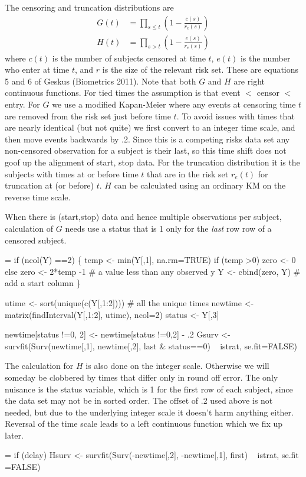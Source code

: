\documentclass{article}
\begin{document}
The censoring and truncation distributions are
\begin{align*}
  G(t) &= \prod_{s \le t} \left(1 - \frac{c(s)}{r_c(s)} \right ) \\
  H(t) &= \prod_{s > t} \left(1 - \frac{e(s)}{r_e(s)} \right ) 
\end{align*}
where $c(t)$ is the number of subjects censored at time $t$, $e(t)$ is the
number who enter at time $t$, and $r$ is the size of the relevant risk set.
These are equations 5 and  6 of Geskus (Biometrics 2011).
Note that both $G$ and $H$ are right continuous functions.
For tied times the assumption is that event $<$ censor $<$ entry.
For $G$ we use a modified Kapan-Meier where any events at censoring time $t$ are
removed from the risk set just before time $t$.
To avoid issues with times that are nearly identical (but not quite) we first
convert to an integer time scale, and then move events backwards by .2.
Since this is a competing risks data set any non-censored observation for a
subject is their last, so this time shift does not goof up the alignment
of start, stop data.
For the truncation distribution it is the subjects with times 
at or before time $t$ that
are in the risk set $r_e(t)$ for truncation at (or before) $t$.
$H$ can be calculated using an ordinary KM on the reverse time scale.

When there is (start,stop) data and hence multiple observations per subject,
calculation of $G$ needs use a status that is 1 only for the \emph{last} row
row of a censored subject. 

\begin{nwchunk}
=
 if (ncol(Y) ==2) \{
     temp <- min(Y[,1], na.rm=TRUE)
     if (temp >0) zero <- 0
     else zero <- 2*temp -1  # a value less than any observed y
     Y <- cbind(zero, Y)  # add a start column
 \}
 
 utime <- sort(unique(c(Y[,1:2])))  # all the unique times
 newtime <- matrix(findInterval(Y[,1:2], utime), ncol=2) 
 status <- Y[,3]
 
 newtime[status !=0, 2] <- newtime[status !=0,2] - .2
 Gsurv <- survfit(Surv(newtime[,1], newtime[,2], last & status==0) ~ istrat, 
                  se.fit=FALSE)
\end{nwchunk}

The calculation for $H$ is also done on the integer scale.
Otherwise we will someday be clobbered by times that differ only in
round off error. The only nuisance is the status variable, which is
1 for the first row of each subject, since the data set may not
be in sorted order.  The offset of .2 used above is not needed, but due
to the underlying integer scale it doesn't harm anything either.
Reversal of the time scale leads to a left continuous function which
we fix up later.
\begin{nwchunk}
=
 if (delay) 
     Hsurv <- survfit(Surv(-newtime[,2], -newtime[,1], first) ~ istrat, 
                      se.fit =FALSE)
\end{nwchunk}
\end{document}
